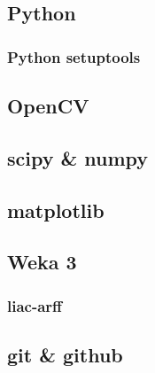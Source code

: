 \subsection{Python}
\subsubsection{Python setuptools}

\subsection{OpenCV}

\subsection{scipy \& numpy}

\subsection{matplotlib}

\subsection{Weka 3}
\subsubsection{liac-arff}

\subsection{git \& github}


